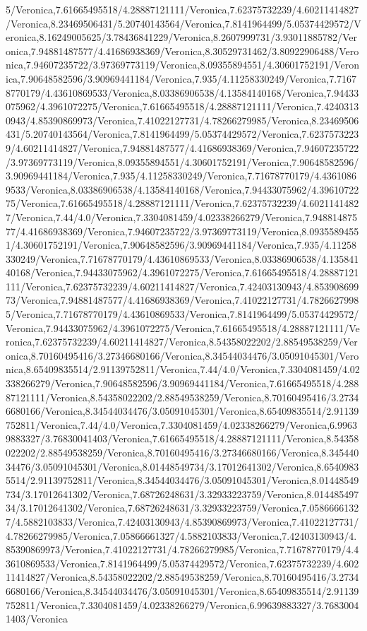 {\begin{tikzternal}
{5/Veronica,7.61665495518/4.28887121111/Veronica,7.62375732239/4.60211414827/Veronica,8.23469506431/5.20740143564/Veronica,7.8141964499/5.05374429572/Veronica,8.16249005625/3.78436841229/Veronica,8.2607999731/3.93011885782/Veronica,7.94881487577/4.41686938369/Veronica,8.30529731462/3.80922906488/Veronica,7.94607235722/3.97369773119/Veronica,8.09355894551/4.30601752191/Veronica,7.90648582596/3.90969441184/Veronica,7.935/4.11258330249/Veronica,7.71678770179/4.43610869533/Veronica,8.03386906538/4.13584140168/Veronica,7.94433075962/4.3961072275/Veronica,7.61665495518/4.28887121111/Veronica,7.42403130943/4.85390869973/Veronica,7.41022127731/4.78266279985/Veronica,8.23469506431/5.20740143564/Veronica,7.8141964499/5.05374429572/Veronica,7.62375732239/4.60211414827/Veronica,7.94881487577/4.41686938369/Veronica,7.94607235722/3.97369773119/Veronica,8.09355894551/4.30601752191/Veronica,7.90648582596/3.90969441184/Veronica,7.935/4.11258330249/Veronica,7.71678770179/4.43610869533/Veronica,8.03386906538/4.13584140168/Veronica,7.94433075962/4.3961072275/Veronica,7.61665495518/4.28887121111/Veronica,7.62375732239/4.60211414827/Veronica,7.44/4.0/Veronica,7.3304081459/4.02338266279/Veronica,7.94881487577/4.41686938369/Veronica,7.94607235722/3.97369773119/Veronica,8.09355894551/4.30601752191/Veronica,7.90648582596/3.90969441184/Veronica,7.935/4.11258330249/Veronica,7.71678770179/4.43610869533/Veronica,8.03386906538/4.13584140168/Veronica,7.94433075962/4.3961072275/Veronica,7.61665495518/4.28887121111/Veronica,7.62375732239/4.60211414827/Veronica,7.42403130943/4.85390869973/Veronica,7.94881487577/4.41686938369/Veronica,7.41022127731/4.78266279985/Veronica,7.71678770179/4.43610869533/Veronica,7.8141964499/5.05374429572/Veronica,7.94433075962/4.3961072275/Veronica,7.61665495518/4.28887121111/Veronica,7.62375732239/4.60211414827/Veronica,8.54358022202/2.88549538259/Veronica,8.70160495416/3.27346680166/Veronica,8.34544034476/3.05091045301/Veronica,8.65409835514/2.91139752811/Veronica,7.44/4.0/Veronica,7.3304081459/4.02338266279/Veronica,7.90648582596/3.90969441184/Veronica,7.61665495518/4.28887121111/Veronica,8.54358022202/2.88549538259/Veronica,8.70160495416/3.27346680166/Veronica,8.34544034476/3.05091045301/Veronica,8.65409835514/2.91139752811/Veronica,7.44/4.0/Veronica,7.3304081459/4.02338266279/Veronica,6.99639883327/3.76830041403/Veronica,7.61665495518/4.28887121111/Veronica,8.54358022202/2.88549538259/Veronica,8.70160495416/3.27346680166/Veronica,8.34544034476/3.05091045301/Veronica,8.01448549734/3.17012641302/Veronica,8.65409835514/2.91139752811/Veronica,8.34544034476/3.05091045301/Veronica,8.01448549734/3.17012641302/Veronica,7.68726248631/3.32933223759/Veronica,8.01448549734/3.17012641302/Veronica,7.68726248631/3.32933223759/Veronica,7.05866661327/4.5882103833/Veronica,7.42403130943/4.85390869973/Veronica,7.41022127731/4.78266279985/Veronica,7.05866661327/4.5882103833/Veronica,7.42403130943/4.85390869973/Veronica,7.41022127731/4.78266279985/Veronica,7.71678770179/4.43610869533/Veronica,7.8141964499/5.05374429572/Veronica,7.62375732239/4.60211414827/Veronica,8.54358022202/2.88549538259/Veronica,8.70160495416/3.27346680166/Veronica,8.34544034476/3.05091045301/Veronica,8.65409835514/2.91139752811/Veronica,7.3304081459/4.02338266279/Veronica,6.99639883327/3.76830041403/Veronica} {
 \DATACIRCLE[\c]{(\x,\y)}
}
\end{tikzternal}
}